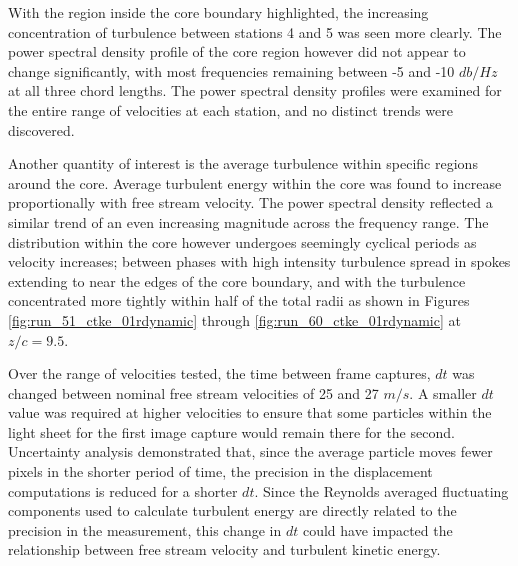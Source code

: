 



With the region inside the core boundary highlighted, the increasing
concentration of turbulence between stations 4 and 5 was seen more clearly. The 
power spectral density profile of the core region however did not appear to 
change significantly, with most frequencies remaining between -5 and -10 
$db/Hz$ at all three chord lengths. The power spectral density profiles were 
examined for the entire range of velocities at each station, and no distinct 
trends were discovered. 





Another quantity of interest is the average turbulence within specific regions 
around the core. Average turbulent energy within the core was found to increase 
proportionally with free stream velocity. The power spectral density reflected 
a similar trend of an even increasing magnitude across the frequency range. The 
distribution within the core however undergoes seemingly cyclical periods as 
velocity increases; between phases with high intensity turbulence spread in 
spokes extending to near the edges of the core boundary, and with the 
turbulence concentrated more tightly within half of the total radii as shown in 
Figures \ref{fig:run_51_ctke_01rdynamic} through 
\ref{fig:run_60_ctke_01rdynamic} at $z/c = 9.5$.












Over the range of velocities tested, the time between frame captures, $dt$ was 
changed between nominal free stream velocities of 25 and 27 $m/s$. A smaller 
$dt$ value was 
required at higher velocities to ensure that some particles within the light 
sheet for the first image capture would remain there for the second. 
Uncertainty analysis demonstrated that, since the average particle moves 
fewer pixels in the shorter period of time, the precision in the displacement 
computations is reduced for a shorter $dt$. Since the Reynolds averaged 
fluctuating components used to calculate turbulent energy are directly related 
to the precision in the measurement, this change in $dt$ could have impacted 
the relationship between free stream velocity and turbulent kinetic energy.

